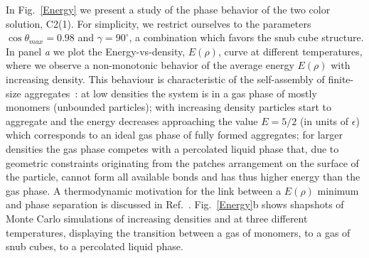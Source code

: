 \documentclass[a4paper, amsfonts, amssymb, amsmath, reprint, showkeys, nofootinbib, twoside]{revtex4-1}
\begin{document}
In Fig.~\ref{Energy} we present a study of the phase behavior of the two color solution, C2(1). For simplicity, we restrict ourselves to the parameters $\cos\theta_{max}=0.98$ and $\gamma=90^\circ$, a combination which favors the snub cube structure. In panel \emph{a} we plot the Energy-vs-density, $E(\rho)$, curve at different temperatures, where we observe a non-monotonic behavior of the average energy $E(\rho)$ with increasing density. This behaviour is characteristic of the self-assembly of finite-size aggregates~\cite{Sciortino2009}: at low densities the system is in a gas phase of mostly monomers (unbounded particles); with increasing density particles start to aggregate and the energy decreases approaching the value $E=5/2$ (in units of $\epsilon$) which corresponds to an ideal gas phase of fully formed aggregates; for larger densities the gas phase competes with a percolated liquid phase that, due to geometric constraints originating from the patches arrangement on the surface of the particle, cannot form all available bonds and has thus higher energy than the gas phase. A thermodynamic motivation for the link between a $E(\rho)$ minimum and phase separation is discussed in Ref.~\cite{Russo2021}. Fig.~\ref{Energy}b shows shapshots of Monte Carlo simulations of increasing densities and at three different temperatures, displaying the transition between a gas of monomers, to a gas of snub cubes, to a percolated liquid phase.



\end{document}
